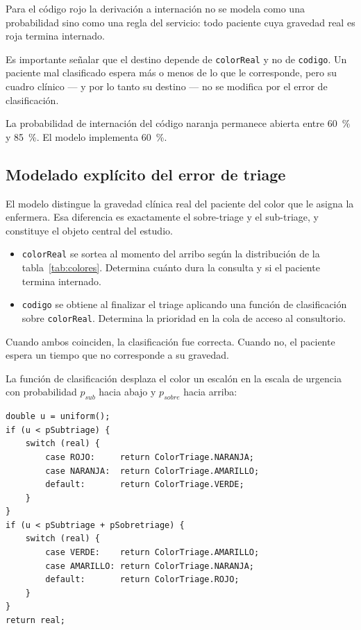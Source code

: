 Para el código rojo la derivación a internación no se modela como una
probabilidad sino como una regla del servicio: todo paciente cuya gravedad
real es roja termina internado.

Es importante señalar que el destino depende de \texttt{colorReal} y no de
\texttt{codigo}. Un paciente mal clasificado espera más o menos de lo que le
corresponde, pero su cuadro clínico --- y por lo tanto su destino --- no se
modifica por el error de clasificación.

\begin{pendiente}
La probabilidad de internación del código naranja permanece abierta entre
60~\% y 85~\%. El modelo implementa 60~\%.
\end{pendiente}

\subsection{Modelado explícito del error de triage}
\label{sec:error}

El modelo distingue la gravedad clínica real del paciente del color que le
asigna la enfermera. Esa diferencia es exactamente el sobre-triage y el
sub-triage, y constituye el objeto central del estudio.

\begin{itemize}
  \item \texttt{colorReal} se sortea al momento del arribo según la
  distribución de la tabla~\ref{tab:colores}. Determina cuánto dura la
  consulta y si el paciente termina internado.
  \item \texttt{codigo} se obtiene al finalizar el triage aplicando una
  función de clasificación sobre \texttt{colorReal}. Determina la prioridad
  en la cola de acceso al consultorio.
\end{itemize}

Cuando ambos coinciden, la clasificación fue correcta. Cuando no, el paciente
espera un tiempo que no corresponde a su gravedad.

La función de clasificación desplaza el color un escalón en la escala de
urgencia con probabilidad $p_{sub}$ hacia abajo y $p_{sobre}$ hacia arriba:

\begin{lstlisting}
double u = uniform();
if (u < pSubtriage) {
    switch (real) {
        case ROJO:     return ColorTriage.NARANJA;
        case NARANJA:  return ColorTriage.AMARILLO;
        default:       return ColorTriage.VERDE;
    }
}
if (u < pSubtriage + pSobretriage) {
    switch (real) {
        case VERDE:    return ColorTriage.AMARILLO;
        case AMARILLO: return ColorTriage.NARANJA;
        default:       return ColorTriage.ROJO;
    }
}
return real;
\end{lstlisting}

